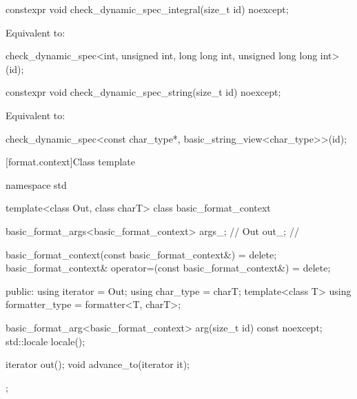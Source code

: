 %
\begin{itemdecl}
constexpr void check_dynamic_spec_integral(size_t id) noexcept;
\end{itemdecl}

\begin{itemdescr}
\pnum
\effects
Equivalent to:
\begin{codeblock}
check_dynamic_spec<int, unsigned int, long long int, unsigned long long int>(id);
\end{codeblock}
\end{itemdescr}

%
\begin{itemdecl}
constexpr void check_dynamic_spec_string(size_t id) noexcept;
\end{itemdecl}

\begin{itemdescr}
\pnum
\effects
Equivalent to:
\begin{codeblock}
check_dynamic_spec<const char_type*, basic_string_view<char_type>>(id);
\end{codeblock}
\end{itemdescr}

[format.context]{Class template }

%
%
%
%
\begin{codeblock}
namespace std {
  template<class Out, class charT>
  class basic_format_context {
    basic_format_args<basic_format_context> args_;      // \expos
    Out out_;                                           // \expos

    basic_format_context(const basic_format_context&) = delete;
    basic_format_context& operator=(const basic_format_context&) = delete;

  public:
    using iterator = Out;
    using char_type = charT;
    template<class T> using formatter_type = formatter<T, charT>;

    basic_format_arg<basic_format_context> arg(size_t id) const noexcept;
    std::locale locale();

    iterator out();
    void advance_to(iterator it);
  };
}
\end{codeblock}

